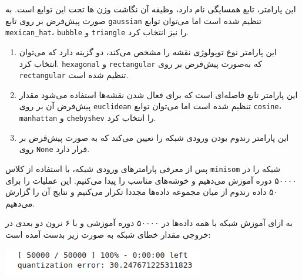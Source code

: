 \begin{enumerate}
\begin{qsolve}
\begin{enumerate}
	 		این پارامتر، تابع همسایگی نام دارد، وظیفه آن نگاشت وزن ها تحت این توابع است. به صورت پیش‌فرض بر روی تابع \texttt{gaussian} تنظیم شده است اما می‌توان توابع \texttt{mexican\_hat}، \texttt{bubble} و \texttt{triangle} را نیز انتخاب کرد.
	 		
	 	\end{enumerate}
	\end{qsolve}
	
	
	
	
	
	\begin{qsolve}
		
	\begin{enumerate}
		\item{}
		
		این پارامتر نوع توپولوژی نقشه را مشخص می‌کند، دو گزینه دارد که می‌توان انتخاب کرد. \texttt{hexagonal} و \texttt{rectangular} که به‌صورت پیش‌فرض بر روی \texttt{rectangular} تنظیم شده است.
	
	
	
		
		\item{}
		این پارامتر تابع فاصله‌ای است که برای فعال شدن نقشه‌ها استفاده می‌شود مقدار پیش‌فرض آن بر روی \texttt{euclidean} تنظیم شده است اما می‌توان توابع \texttt{cosine}، \texttt{manhattan} و \texttt{chebyshev} را انتخاب کرد.
		
		
		
		
		\item{}
		
		این پارامتر رندوم بودن ورودی شبکه را تعیین می‌کند که به صورت پیش‌فرض بر روی \texttt{None} قرار دارد.
	\end{enumerate}
	
	
		
		پس از معرفی پارامتر‌های ورودی شبکه، با استفاده از کلاس \texttt{minisom} شبکه را در ۵۰۰۰۰ دوره آموزش می‌دهیم و خوشه‌های مناسب را پیدا می‌کنیم. این عملیات را برای ۵۰ داده رندوم از میان مجموعه داده‌ها مجددا تکرار می‌کنیم و نتایج آن را گزارش می‌دهیم.
		
		
		به ازای آموزش شبکه با همه داده‌ها در ۵۰۰۰۰ دوره آموزشی و با ۶ نرون دو بعدی در خروجی مقدار خطای شبکه به صورت زیر بدست آمده است:
		
		\begin{center}
			\includegraphics*[width=0.7\linewidth]{pics/img17.png}
			\label{خطای شبکه}
		\end{center}
		

\end{qsolve}
\end{enumerate}
